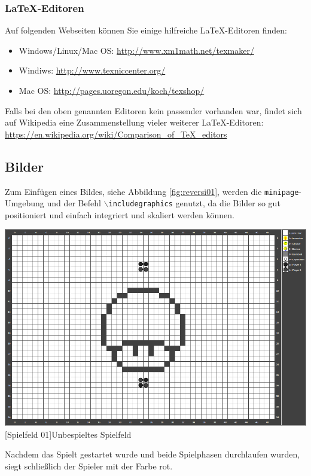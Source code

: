 \documentclass[12pt,a4paper,bibliography=totocnumbered,listof=totocnumbered]{scrartcl}
\begin{document}
\subsubsection{\LaTeX-Editoren}
Auf folgenden Webseiten können Sie einige hilfreiche \LaTeX-Editoren finden:
\begin{itemize}
  \item Windows/Linux/Mac OS: \url{http://www.xm1math.net/texmaker/}
  \item Windiws: \url{http://www.texniccenter.org/}
  \item Mac OS: \url{http://pages.uoregon.edu/koch/texshop/}
\end{itemize}

Falls bei den oben genannten Editoren kein passender vorhanden war, findet sich auf Wikipedia eine Zusammenstellung vieler weiterer \LaTeX-Editoren:\\[1em]
\hspace*{3cm}\url{https://en.wikipedia.org/wiki/Comparison_of_TeX_editors}


\subsection{Bilder}
Zum Einfügen eines Bildes, siehe Abbildung \ref{fig:reversi01}, werden die \texttt{minipage}-Umgebung und der Befehl \texttt{$\backslash$includegraphics} genutzt, da die Bilder so gut positioniert und einfach integriert und skaliert werden können.

\vspace{1em}
\begin{minipage}{\linewidth}
	\centering
	\includegraphics[width=0.5\linewidth]{pics/gamefield01.png}
	[Spielfeld 01]{Unbespieltes Spielfeld\footnotemark }
	\label{fig:reversi01}
\end{minipage}

Nachdem das Spielt gestartet wurde und beide Spielphasen durchlaufen wurden, siegt schließlich der Spieler mit der Farbe rot.
\end{document}
